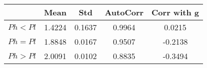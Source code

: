 \begin{tiny}\begin{tabular}{|l|c|c|c|c|}
\hline
&\textbf{Mean}&\textbf{Std}&\textbf{AutoCorr}&\textbf{Corr with g}\\\hline
\textbf{$Ph<Pl$}&1.4224&0.1637&0.9964&0.0215\\\hline
\textbf{$Ph=Pl$}&1.8848&0.0167&0.9507&-0.2138\\\hline
\textbf{$Ph>Pl$}&2.0091&0.0102&0.8835&-0.3494\\\hline
\end{tabular}
\end{tiny}